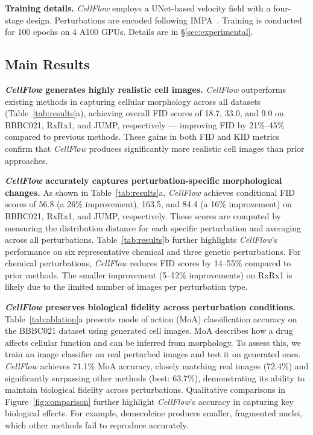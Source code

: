 \textbf{Training details.} \emph{CellFlow} employs a UNet-based velocity field with a four-stage design. Perturbations are encoded following IMPA~\cite{palma2023predicting}. Training is conducted for 100 epochs on 4 A100 GPUs. Details are in \S\ref{sec:experimental}.



\subsection{Main Results}

\textbf{\emph{CellFlow} generates highly realistic cell images.}  
\emph{CellFlow} outperforms existing methods in capturing cellular morphology across all datasets (Table~\ref{tab:results}a), achieving overall FID scores of 18.7, 33.0, and 9.0 on BBBC021, RxRx1, and JUMP, respectively --- improving FID by 21\%–45\% compared to previous methods. These gains in both FID and KID metrics confirm that \emph{CellFlow} produces significantly more realistic cell images than prior approaches.

\textbf{\emph{CellFlow} accurately captures perturbation-specific morphological changes.}  
As shown in Table~\ref{tab:results}a, \emph{CellFlow} achieves conditional FID scores of 56.8 (a 26\% improvement), 163.5, and 84.4 (a 16\% improvement) on BBBC021, RxRx1, and JUMP, respectively. These scores are computed by measuring the distribution distance for each specific perturbation and averaging across all perturbations.   
Table~\ref{tab:results}b further highlights \emph{CellFlow}’s performance on six representative chemical and three genetic perturbations. For chemical perturbations, \emph{CellFlow} reduces FID scores by 14–55\% compared to prior methods.
The smaller improvement (5–12\% improvements) on RxRx1 is likely due to the limited number of images per perturbation type.

\textbf{\emph{CellFlow} preserves biological fidelity across perturbation conditions.} 
Table~\ref{tab:ablation}a presents mode of action (MoA) classification accuracy on the BBBC021 dataset using generated cell images. MoA describes how a drug affects cellular function and can be inferred from morphology. To assess this, we train an image classifier on real perturbed images and test it on generated ones. \emph{CellFlow} achieves 71.1\% MoA accuracy, closely matching real images (72.4\%) and significantly surpassing other methods (best: 63.7\%), demonstrating its ability to maintain biological fidelity across perturbations. Qualitative comparisons in Figure~\ref{fig:comparison} further highlight \emph{CellFlow}’s accuracy in capturing key biological effects. For example, demecolcine produces smaller, fragmented nuclei, which other methods fail to reproduce accurately.

